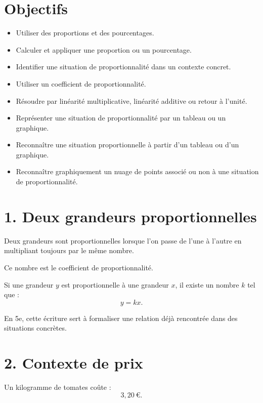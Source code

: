 
\section{Objectifs}

\begin{itemize}
\item Utiliser des proportions et des pourcentages.
\item Calculer et appliquer une proportion ou un pourcentage.
\item Identifier une situation de proportionnalité dans un contexte concret.
\item Utiliser un coefficient de proportionnalité.
\item Résoudre par linéarité multiplicative, linéarité additive ou retour à l'unité.
\item Représenter une situation de proportionnalité par un tableau ou un graphique.
\item Reconnaître une situation proportionnelle à partir d'un tableau ou d'un graphique.
\item Reconnaître graphiquement un nuage de points associé ou non à une situation de proportionnalité.
\end{itemize}

\section{1. Deux grandeurs proportionnelles}

Deux grandeurs sont proportionnelles lorsque l'on passe de l'une à l'autre en multipliant toujours par le même nombre.

Ce nombre est le coefficient de proportionnalité.

\begin{definition}
Si une grandeur $y$ est proportionnelle à une grandeur $x$, il existe un nombre $k$ tel que :
\[
y=kx.
\]
\end{definition}

En 5e, cette écriture sert à formaliser une relation déjà rencontrée dans des situations concrètes.

\section{2. Contexte de prix}

Un kilogramme de tomates coûte :
\[
3{,}20\ \text{€}.
\]


